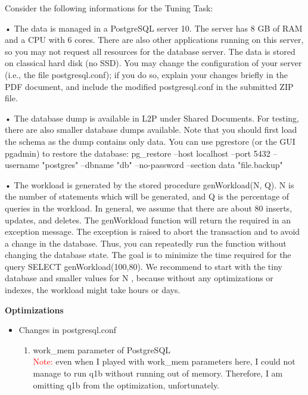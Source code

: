 \documentclass[10pt]{article}
\begin{document}
\begin{enumerate}
		Consider the following informations for the Tuning Task:
		
		
		• The data is managed in a PostgreSQL server 10. The server has 8 GB of RAM and
		a CPU with 6 cores. There are also other applications running on this server, so you
		may not request all resources for the database server. The data is stored on classical
		hard disk (no SSD). You may change the configuration of your server (i.e., the file
		postgresql.conf); if you do so, explain your changes briefly in the PDF document, and
		include the modified postgresql.conf in the submitted ZIP file.
		
		• The database dump is available in L2P under Shared Documents. For testing, there are
		also smaller database dumps available. Note that you should first load the schema as
		the dump contains only data. You can use pgrestore (or the GUI pgadmin) to restore
		the database:
		pg\_restore --host localhost --port 5432 --username "postgres" --dbname "db"
		--no-password --section data "file.backup"
		
		• The workload is generated by the stored procedure genWorkload(N, Q). N is the
		number of statements which will be generated, and Q is the percentage of queries
		in the workload. In general, we assume that there are about 80%
		inserts, updates, and deletes. The genWorkload function will return the required in
		an exception message. The exception is raised to abort the transaction and to avoid a
		change in the database. Thus, you can repeatedly run the function without changing
		the database state. The goal is to minimize the time required for the query
		SELECT genWorkload(100,80). We recommend to start with the tiny database and
		smaller values for N , because without any optimizations or indexes, the workload might
		take hours or days.
		
		\clearpage
		
		\textbf{Optimizations}
		
		\begin{itemize}
			\item Changes in postgresql.conf
			
				\begin{enumerate}[1.]
					\item work\_mem parameter of PostgreSQL\\
					
					\textcolor{red}{Note:} even when I played with work\_mem parameters here, I could not manage to run q1b without running out of memory. Therefore, I am omitting q1b from the optimization, unfortunately.\\
					

\end{enumerate}
\end{itemize}
\end{enumerate}
\end{document}
